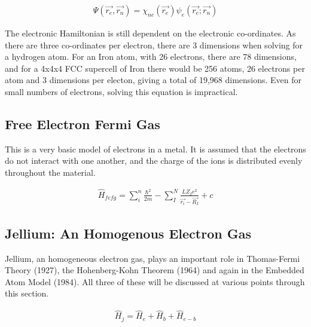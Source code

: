 \begin{equation}
\begin{split}
\Psi (\vec{r_e}, \vec{r_n}) = \chi_{ne} (\vec{r_e}) \psi_{e} (\vec{r_e}; \vec{r_n})
\end{split}
\label{eq:eqTimeIndependentSchrodinger}
\end{equation}

The electronic Hamiltonian is still dependent on the electronic co-ordinates.  As there are three co-ordinates per electron, there are 3 dimensions when solving for a hydrogen atom.  For an Iron atom, with 26 electrons, there are 78 dimensions, and for a 4x4x4 FCC supercell of Iron there would be 256 atoms, 26 electrons per atom and 3 dimensions per electon, giving a total of 19,968 dimensions.  Even for small numbers of electrons, solving this equation is impractical.





\subsection{Free Electron Fermi Gas}

This is a very basic model of electrons in a metal.  It is assumed that the electrons do not interact with one another, and the charge of the ions is distributed evenly throughout the material.


\begin{equation}
\begin{split}
\hat{H}_{fefg} = \sum_{i}^{n} \frac{\hbar^2}{2 m} - \sum_{I}^{N} \frac{L Z_I e^2}{\vec{r_{i}} - \vec{R_{I}}} + c
\end{split}
\label{eq:eqFreeElectronFermiGas}
\end{equation}


\subsection{Jellium: An Homogenous Electron Gas}

Jellium, an homogeneous electron gas, plays an important role in Thomas-Fermi Theory (1927), the Hohenberg-Kohn Theorem (1964) and again in the Embedded Atom Model (1984).  All three of these will be discussed at various points through this section.


\begin{equation}
\begin{split}
\hat{H}_{j} = \hat{H}_{e} + \hat{H}_{b} + \hat{H}_{e-b} 
\end{split}
\label{eq:eqJellium}
\end{equation}





